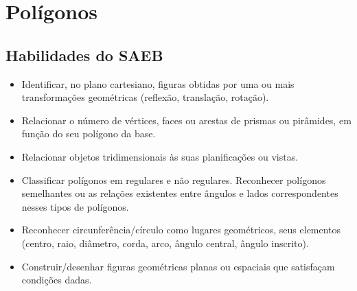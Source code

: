 {{%










\chapter{Polígonos}

\section*{Habilidades do SAEB}

\begin{itemize}
\item Identificar, no plano cartesiano, figuras obtidas
por uma ou mais transformações geométricas (reflexão, translação,
rotação).
\item
  Relacionar o número de vértices, faces ou arestas de prismas ou
  pirâmides, em função do seu polígono da base.
\item
  Relacionar objetos tridimensionais às suas planificações ou vistas.
\item
  Classificar polígonos em regulares e não regulares. Reconhecer
  polígonos semelhantes ou as relações existentes entre ângulos e lados
  correspondentes nesses tipos de polígonos.
\item
  Reconhecer circunferência/círculo como lugares geométricos, seus
  elementos (centro, raio, diâmetro, corda, arco, ângulo central, ângulo
  inscrito).
\item
  Construir/desenhar figuras geométricas planas ou espaciais que
  satisfaçam condições dadas.
\end{itemize}

}}
